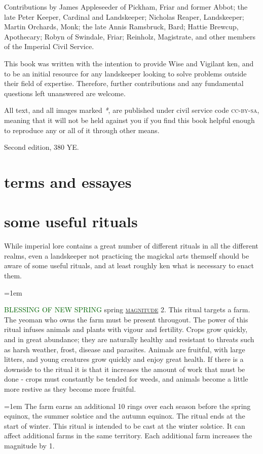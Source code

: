 \documentclass[twoside,11pt,b5paper]{scrbook}
\newcommand{\keyword}[1]{%
  \textcolor{darkgreen}{\expandafter\MakeUppercase{#1}}%
}
\newcommand{\moreindentpar}{\par\hangindent=1em\setlength{\parindent}{2em}}
\newcommand{\noop}{}
\let\endarticle\noop
\renewcommand{\paragraph}[1]{%
  \endarticle%
  \par\hangindent=1em\noindent%
  \let\localpar\moreindentpar
  \markboth{#1}{#1}%
  {\keyword{#1}}\label{#1}%
  \renewcommand{\endarticle}{}
}
\newcommand{\s}[1]{{\textsc{\textcolor{marron}{\hyperref[#1]{#1}}}}}
\begin{document}
\begin{uppertitleback}{}
Contributions by James Appleseeder of Pickham, Friar and former Abbot; the late Peter Keeper, Cardinal and Lands\-keeper; Nicholas Reaper, Lands\-keeper; Martin Orchards, Monk; the late Annis Ramsbruck, Bard; Hattie Brewcup, Apothecary; Robyn of Swindale, Friar; Reinholz, Magistrate, and other members of the Imperial Civil Service.

This book was written with the intention to provide Wise and Vigilant ken, and to be an initial resource for any landskeeper looking to solve problems outside their field of expertise. Therefore, further contributions and any fundamental questions left unanswered are welcome.

All text, and all images marked \textit{*}, are published under civil service code \textsc{cc-by-sa}, meaning that it will not be held against you if you find this book helpful enough to reproduce any or all of it through other means. 

Second edition, 380 YE.
\end{uppertitleback}
\setlength{\parindent}{1em}

\listoftables

\chapter{terms and essayes}
\begin{multicols}{2}

\end{multicols}

\chapter{some useful rituals}
\label{appendix}
While imperial lore contains a great number of different rituals in all the different realms, even a landskeeper not practicing the magickal arts themself should be aware of some useful rituals, and at least roughly ken what is necessary to enact them.
\paragraph{blessing of new spring} spring \s{magnitude} 2. This ritual targets a farm. The yeoman who owns the farm must be present througout. The power of this ritual infuses animals and plants with vigour and fertility. Crops grow quickly, and in great abundance; they are naturally healthy and resistant to threats such as harsh weather, frost, disease and parasites. Animals are fruitful, with large litters, and young creatures grow quickly and enjoy great health. If there is a downside to the ritual it is that it increases the amount of work that must be done - crops must constantly be tended for weeds, and animals become a little more restive as they become more fruitful. 
\localpar
The farm earns an additional 10 rings over each season before the spring equinox, the summer solstice and the autumn equinox. The ritual ends at the start of winter. This ritual is intended to be cast at the winter solstice. It can affect additional farms in the same territory. Each additional farm increases the magnitude by 1.
\end{document}
